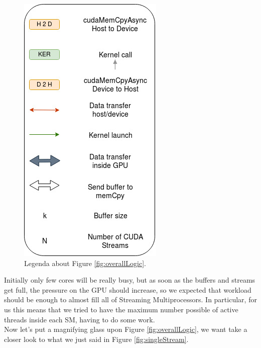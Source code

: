 	\begin{figure}
		\centering
		\includegraphics[width=1\linewidth]{images/logicLegenda.jpg}
		\caption{Legenda about Figure \ref{fig:overallLogic}.}
	\end{figure}
	Initially only few cores will be really busy, but as soon as the buffers and streams get full, the pressure on the GPU should increase, so we expected that workload should be enough to almost fill all of Streaming Multiprocessors.
	In particular, for us this means that we tried to have the maximum number possible of active threads inside each SM, having to do some work.\\
	Now let's put a magnifying glass upon Figure \ref{fig:overallLogic}, we want take a closer look to what we just said in Figure  \ref{fig:singleStream}.\\
	
